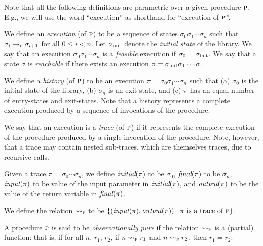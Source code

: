 Note that all the following definitions are parametric over a given procedure $\textsc{p}$.
E.g., we will use the word ``execution'' as shorthand for ``execution of $\textsc{p}$''.

We define an \emph{execution} (of $\textsc{p}$) to be a sequence of states $\sigma_0 \sigma_1 \cdots \sigma_n$ such that
$\sigma_i \rightarrow_{\textsc{p}} \sigma_{i+1}$ for all $0 \leq i < n$.
Let $\sigma_{\text{init}}$ denote the \emph{initial state} of the library.
We say that an execution $\sigma_0 \sigma_1 \cdots \sigma_n$ is a \emph{feasible} execution if $\sigma_0 = \sigma_{\text{init}}$.
We say that a state $\sigma$ is \emph{ reachable} if there exists an execution $\pi = \sigma_{\text{init}} \sigma_1 \cdots \sigma$.

We define a \emph{history} (of $\textsc{p}$) to be an execution $\pi = \sigma_0 \sigma_1 \cdots \sigma_n$ such that
(a) $\sigma_0$ is the initial state of the library,
(b) $\sigma_n$ is an exit-state, and
(c) $\pi$ has an equal number of entry-states and exit-states.
Note that a history represents a complete  execution produced by a
sequence of invocations of the procedure.

We say that an execution is a \emph{trace} (of $\textsc{p}$) if it represents the complete execution
of the procedure produced by a single invocation of the procedure.
Note, however, that a trace may contain nested sub-traces,
which are themselves traces, due to recursive calls.

Given a trace $\pi = \sigma_0 \cdots \sigma_n$, we define
$\textit{initial}(\pi)$ to be $\sigma_0$,
$\textit{final}(\pi)$ to be $\sigma_n$,
$\textit{input}(\pi)$ to be value of the input parameter in $\textit{initial}(\pi)$,
and $\textit{output}(\pi)$ to be the value of the return variable in $\textit{final}(\pi)$.

We define the relation $\rightsquigarrow_{\textsc{p}}$ to be $\{ (\textit{input}(\pi),\textit{output}(\pi)) \; | \; \pi \text{ is a trace of } \textsc{p} \}$.

\begin{definition}
\label{def:purity}
A procedure $\textsc{p}$ is said to be \emph{observationally pure} if the relation $\rightsquigarrow_{\textsc{p}}$ is a (partial) function:
that is, if for all $n$, $r_1$, $r_2$, if  $n \rightsquigarrow_{\textsc{p}} r_1$ and $n \rightsquigarrow_{\textsc{p}} r_2$, then $r_1 = r_2$.
\end{definition}

